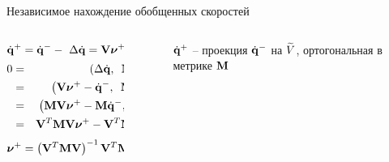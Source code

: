 \begin{frame}{Независимое нахождение обобщенных скоростей}
    \begin{columns}
        \hspace{15pt}
        \begin{column}{0.35\textwidth}
            $$ \dot{\mathbf{q}}^+ = \dot{\mathbf{q}}^- -\ \Delta\dot{\mathbf{q}} = \mathbf{V}\boldsymbol{\mathbf{\nu}}^+ \in \widetilde{V} $$
            \begin{eqnarray*}
                0 & = & \left( \Delta\dot{\mathbf{q}}, \enspace \mathbf{M}\mathbf{V} \right) \\
                  & = & \left( \mathbf{V}\boldsymbol{\mathbf{\nu}}^+ - \dot{\mathbf{q}}^-, \enspace \mathbf{M}\mathbf{V} \right) \\
                  & = & \left( \mathbf{M}\mathbf{V}\boldsymbol{\mathbf{\nu}}^+ - \mathbf{M}\dot{\mathbf{q}}^-, \enspace \mathbf{V} \right) \\
                  & = & \mathbf{V}^T\mathbf{M}\mathbf{V}\boldsymbol{\mathbf{\nu}}^+ - \mathbf{V}^T\mathbf{M}\dot{\mathbf{q}}^-
            \end{eqnarray*}
            \vspace{0.35pt}
            $$ \boldsymbol{\mathbf{\nu}}^+ = \left( \mathbf{V}^T\mathbf{M}\mathbf{V} \right)^{-1}\mathbf{V}^T\mathbf{M}\dot{\mathbf{q}}^- $$
        \end{column}
        \hspace{55pt}
        \begin{column}{0.65\textwidth}
            \begin{figure}
                \hspace{-65pt}
                \caption{
                    $\dot{\mathbf{q}}^+$ -- проекция $\dot{\mathbf{q}}^-$ на $\widetilde{V}$,\newline
                    ортогональная в метрике $\mathbf{M}$
                }
            \end{figure}
        \end{column}
    \end{columns}
\end{frame}

